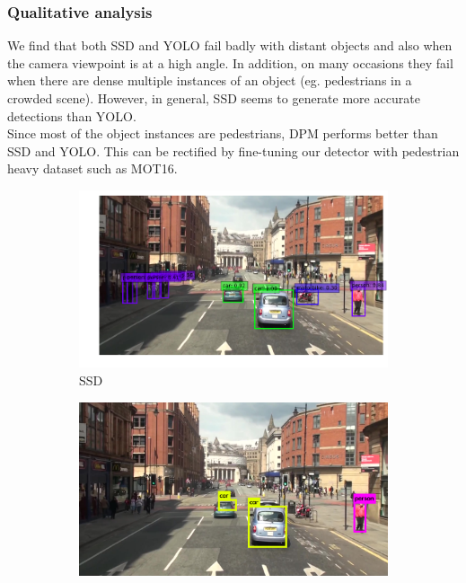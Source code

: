 \documentclass[10pt,twocolumn,letterpaper]{article}
\begin{document}
\subsubsection*{Qualitative analysis}
We find that both SSD and YOLO fail badly with distant objects and also when the camera viewpoint is at a high angle. In addition, on many occasions they fail when there are dense multiple instances of an object (eg. pedestrians in a crowded scene). However, in general, SSD seems to generate more accurate detections than YOLO. \\
Since most of the object instances are pedestrians, DPM performs better than SSD and YOLO. This can be rectified by fine-tuning our detector with pedestrian heavy dataset such as MOT16.\\

\begin{figure}[!tbp]
  \begin{subfigure}[b]{0.3\textwidth}
    \includegraphics[width=\textwidth]{ssd_mot16-13-100.png}
    \caption{SSD}
    \label{fig:ssd_mot16_13_100}
  \end{subfigure}
  \hfill
  \begin{subfigure}[b]{0.3\textwidth}
    \includegraphics[width=\textwidth]{yolo_mot16-13-100.png}

\end{subfigure}
\end{figure}
\end{document}

